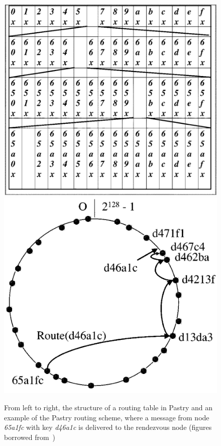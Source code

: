 \begin{figure}
    \includegraphics[scale=0.19]{img/pastry_table.png}
    \includegraphics[scale=0.19]{img/pastry_routing.png}
    \caption{From
        left to right, the structure of a routing table in Pastry and an
        example of the Pastry routing scheme, where a message from node
        \emph{65a1fc} with key \emph{d46a1c} is delivered to the rendezvous
        node (figures borrowed from~\cite{Castro:2002})}
\end{figure}

